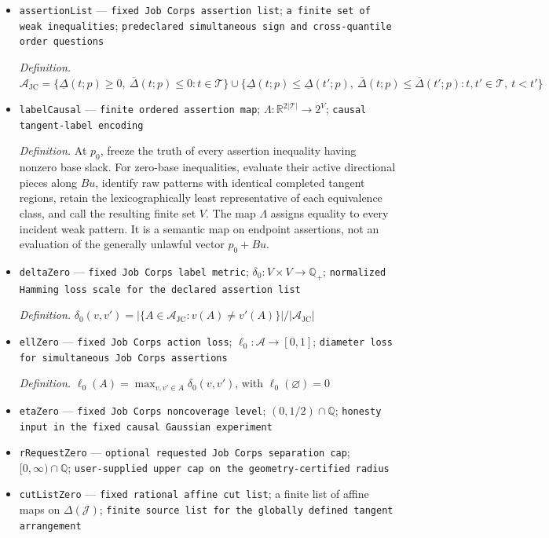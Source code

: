 \documentclass{article}
\begin{document}
\begin{itemize}
  \item \texttt{assertionList} --- \texttt{fixed Job Corps assertion list}; \texttt{a finite set of weak inequalities}; \texttt{predeclared simultaneous sign and cross-\allowbreak{}quantile order questions}
  \par\smallskip\noindent\emph{Definition.} \(\mathscr A_{\mathrm{JC}}=\{\underline\Delta(t;p)\ge0,\ \overline\Delta(t;p)\le0:t\in\mathcal T\}\cup\{\underline\Delta(t;p)\le\underline\Delta(t';p),\ \overline\Delta(t;p)\le\overline\Delta(t';p):t,t'\in\mathcal T,\ t<t'\}\)
  \item \texttt{labelCausal} --- \texttt{finite ordered assertion map}; \(\Lambda:\mathbb R^{2|\mathcal T|}\to2^V\); \texttt{causal tangent-\allowbreak{}label encoding}
  \par\smallskip\noindent\emph{Definition.} At \(p_0\), freeze the truth of every assertion inequality having nonzero base slack. For zero-base inequalities, evaluate their active directional pieces along \(Bu\), identify raw patterns with identical completed tangent regions, retain the lexicographically least representative of each equivalence class, and call the resulting finite set \(V\). The map \(\Lambda\) assigns equality to every incident weak pattern. It is a semantic map on endpoint assertions, not an evaluation of the generally unlawful vector \(p_0+Bu\).
  \item \texttt{deltaZero} --- \texttt{fixed Job Corps label metric}; \(\delta_0:V\times V\to\mathbb Q_{+}\); \texttt{normalized Hamming loss scale for the declared assertion list}
  \par\smallskip\noindent\emph{Definition.} \(\delta_0(v,v')=|\{A\in\mathscr A_{\mathrm{JC}}:v(A)\ne v'(A)\}|/|\mathscr A_{\mathrm{JC}}|\)
  \item \texttt{ellZero} --- \texttt{fixed Job Corps action loss}; \(\ell_0:\mathcal A\to[0,1]\); \texttt{diameter loss for simultaneous Job Corps assertions}
  \par\smallskip\noindent\emph{Definition.} \(\ell_0(A)=\max_{v,v'\in A}\delta_0(v,v')\), with \(\ell_0(\varnothing)=0\)
  \item \texttt{etaZero} --- \texttt{fixed Job Corps noncoverage level}; \((0,1/2)\cap\mathbb Q\); \texttt{honesty input in the fixed causal Gaussian experiment}
  \item \texttt{rRequestZero} --- \texttt{optional requested Job Corps separation cap}; \([0,\infty)\cap\mathbb Q\); \texttt{user-\allowbreak{}supplied upper cap on the geometry-\allowbreak{}certified radius}
  \item \texttt{cutListZero} --- \texttt{fixed rational affine cut list}; a finite list of affine maps on \(\Delta(\mathcal J)\); \texttt{finite source list for the globally defined tangent arrangement}

\end{itemize}
\end{document}
